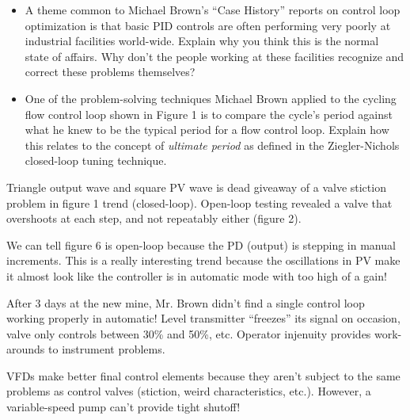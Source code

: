 \begin{itemize}
\item{} A theme common to Michael Brown's ``Case History'' reports on control loop optimization is that basic PID controls are often performing very poorly at industrial facilities world-wide.  Explain why you think this is the normal state of affairs.  Why don't the people working at these facilities recognize and correct these problems themselves?
\item{} One of the problem-solving techniques Michael Brown applied to the cycling flow control loop shown in Figure 1 is to compare the cycle's period against what he knew to be the typical period for a flow control loop.  Explain how this relates to the concept of {\it ultimate period} as defined in the Ziegler-Nichols closed-loop tuning technique.
\end{itemize}














Triangle output wave and square PV wave is dead giveaway of a valve stiction problem in figure 1 trend (closed-loop).  Open-loop testing revealed a valve that overshoots at each step, and not repeatably either (figure 2).

\vskip 10pt

We can tell figure 6 is open-loop because the PD (output) is stepping in manual increments.  This is a really interesting trend because the oscillations in PV make it almost look like the controller is in automatic mode with too high of a gain!

\vskip 10pt

After 3 days at the new mine, Mr. Brown didn't find a single control loop working properly in automatic!  Level transmitter ``freezes'' its signal on occasion, valve only controls between 30\% and 50\%, etc.  Operator injenuity provides work-arounds to instrument problems.

\vskip 10pt

VFDs make better final control elements because they aren't subject to the same problems as control valves (stiction, weird characteristics, etc.).  However, a variable-speed pump can't provide tight shutoff!





